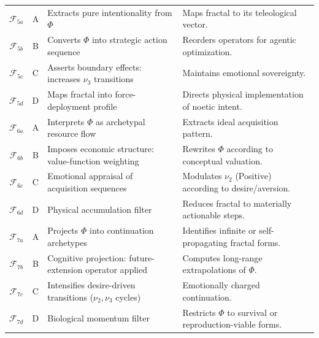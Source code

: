 \documentclass[11pt,twoside,openright]{book}
\theoremstyle{definition}
\theoremstyle{plain}
\theoremstyle{remark}
\newcommand{\Foundations}{\mathcal{F}}
\newcommand{\noe}[1]{\nu_{#1}}
\newcommand{\Frac}{\Phi}
\begin{document}
\begin{longtable}{c|c|p{5cm}|p{5cm}}
\midrule

$\Foundations_{5a}$ & A & Extracts pure intentionality from $\Frac$ &
Maps fractal to its teleological vector. \\

$\Foundations_{5b}$ & B & Converts $\Frac$ into strategic action sequence &
Reorders operators for agentic optimization. \\

$\Foundations_{5c}$ & C & Asserts boundary effects: increases $\noe{3}$ transitions &
Maintains emotional sovereignty. \\

$\Foundations_{5d}$ & D & Maps fractal into force-deployment profile &
Directs physical implementation of noetic intent. \\

\midrule

$\Foundations_{6a}$ & A & Interprets $\Frac$ as archetypal resource flow &
Extracts ideal acquisition pattern. \\

$\Foundations_{6b}$ & B & Imposes economic structure: value-function weighting &
Rewrites $\Frac$ according to conceptual valuation. \\

$\Foundations_{6c}$ & C & Emotional appraisal of acquisition sequences &
Modulates $\noe{2}$ (Positive) according to desire/aversion. \\

$\Foundations_{6d}$ & D & Physical accumulation filter &
Reduces fractal to materially actionable steps. \\

\midrule

$\Foundations_{7a}$ & A & Projects $\Frac$ into continuation archetypes &
Identifies infinite or self-propagating fractal forms. \\

$\Foundations_{7b}$ & B & Cognitive projection: future-extension operator applied &
Computes long-range extrapolations of $\Frac$. \\

$\Foundations_{7c}$ & C & Intensifies desire-driven transitions ($\noe{2},\noe{3}$ cycles) &
Emotionally charged continuation. \\

$\Foundations_{7d}$ & D & Biological momentum filter &
Restricts $\Frac$ to survival or reproduction-viable forms. \\

\end{longtable}
\end{document}

